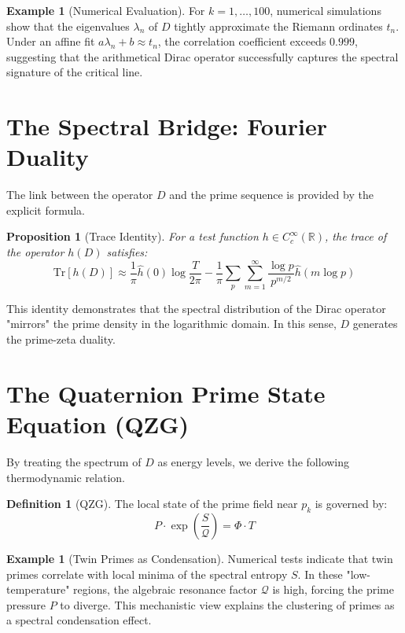 \documentclass[11pt,a4paper,reqno]{article}
\theoremstyle{plain}
\newtheorem{proposition}[theorem]{Proposition}
\theoremstyle{definition}
\newtheorem{definition}[theorem]{Definition}
\newtheorem{example}[theorem]{Example}
\theoremstyle{remark}
\newcommand{\entropy}{S}
\newcommand{\formfactor}{\mathcal{Q}}
\newcommand{\pressure}{P}
\newcommand{\temperature}{T}
\newcommand{\RR}{\mathbb{R}}
\newcommand{\Tr}{\text{Tr}}
\begin{document}
\begin{example}[Numerical Evaluation]
For $k=1, \dots, 100$, numerical simulations show that the eigenvalues $\lambda_n$ of $D$ tightly approximate the Riemann ordinates $t_n$. Under an affine fit $a \lambda_n + b \approx t_n$, the correlation coefficient exceeds $0.999$, suggesting that the arithmetical Dirac operator successfully captures the spectral signature of the critical line.
\end{example}

\section{The Spectral Bridge: Fourier Duality}

The link between the operator $D$ and the prime sequence is provided by the explicit formula.

\begin{proposition}[Trace Identity]
For a test function $h \in C_c^\infty(\RR)$, the trace of the operator $h(D)$ satisfies:
\begin{equation}
\Tr[h(D)] \approx \frac{1}{\pi} \widehat{h}(0) \log \frac{T}{2\pi} - \frac{1}{\pi} \sum_{p} \sum_{m=1}^\infty \frac{\log p}{p^{m/2}} \widehat{h}(m \log p)
\end{equation}
\end{proposition}

This identity demonstrates that the spectral distribution of the Dirac operator "mirrors" the prime density in the logarithmic domain. In this sense, $D$ generates the prime-zeta duality.

\section{The Quaternion Prime State Equation (QZG)}

By treating the spectrum of $D$ as energy levels, we derive the following thermodynamic relation.

\begin{definition}[QZG]
The local state of the prime field near $p_k$ is governed by:
\begin{equation}
\pressure \cdot \exp\left(\frac{\entropy}{\formfactor}\right) = \Phi \cdot \temperature
\end{equation}
\end{definition}

\begin{example}[Twin Primes as Condensation]
Numerical tests indicate that twin primes correlate with local minima of the spectral entropy $S$. In these "low-temperature" regions, the algebraic resonance factor $\mathcal{Q}$ is high, forcing the prime pressure $P$ to diverge. This mechanistic view explains the clustering of primes as a spectral condensation effect.
\end{example}
\end{document}
